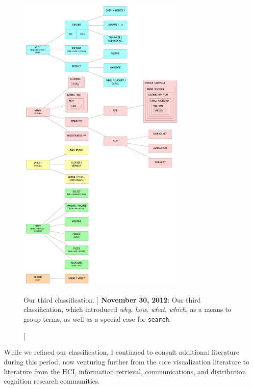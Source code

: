 

\begin{figure}
	\centering
	\includegraphics[width=0.75\textwidth]{figures/typology-12-11-30.pdf}
	\caption
	[
	    Our third classification.
	]
	{
	    {\bf November 30, 2012}: Our third classification, which introduced \textsl{why}, \textsl{how}, \textsl{what}, \textsl{which}, as a means to group terms, as well as a special case for {\tt search}.
	}
	\centering
	\label{app:typology:fig:12.11.30}
\end{figure}


While we refined our classification, I continued to consult additional literature during this period, now venturing further from the core visualization literature to literature from the \ac{HCI}, information retrieval, communications, and distribution cognition research communities.

